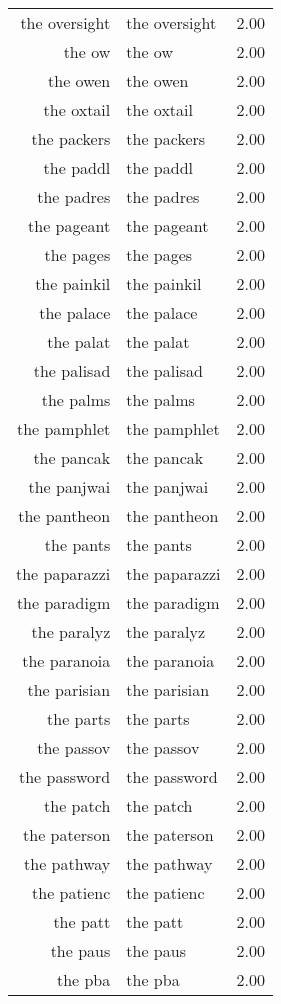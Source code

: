 \begin{table}[ht]
\begin{tabular}{rlr}
  the oversight & the oversight & 2.00 \\ 
  the ow & the ow & 2.00 \\ 
  the owen & the owen & 2.00 \\ 
  the oxtail & the oxtail & 2.00 \\ 
  the packers & the packers & 2.00 \\ 
  the paddl & the paddl & 2.00 \\ 
  the padres & the padres & 2.00 \\ 
  the pageant & the pageant & 2.00 \\ 
  the pages & the pages & 2.00 \\ 
  the painkil & the painkil & 2.00 \\ 
  the palace & the palace & 2.00 \\ 
  the palat & the palat & 2.00 \\ 
  the palisad & the palisad & 2.00 \\ 
  the palms & the palms & 2.00 \\ 
  the pamphlet & the pamphlet & 2.00 \\ 
  the pancak & the pancak & 2.00 \\ 
  the panjwai & the panjwai & 2.00 \\ 
  the pantheon & the pantheon & 2.00 \\ 
  the pants & the pants & 2.00 \\ 
  the paparazzi & the paparazzi & 2.00 \\ 
  the paradigm & the paradigm & 2.00 \\ 
  the paralyz & the paralyz & 2.00 \\ 
  the paranoia & the paranoia & 2.00 \\ 
  the parisian & the parisian & 2.00 \\ 
  the parts & the parts & 2.00 \\ 
  the passov & the passov & 2.00 \\ 
  the password & the password & 2.00 \\ 
  the patch & the patch & 2.00 \\ 
  the paterson & the paterson & 2.00 \\ 
  the pathway & the pathway & 2.00 \\ 
  the patienc & the patienc & 2.00 \\ 
  the patt & the patt & 2.00 \\ 
  the paus & the paus & 2.00 \\ 
  the pba & the pba & 2.00 \\ 

\end{tabular}
\end{table}
